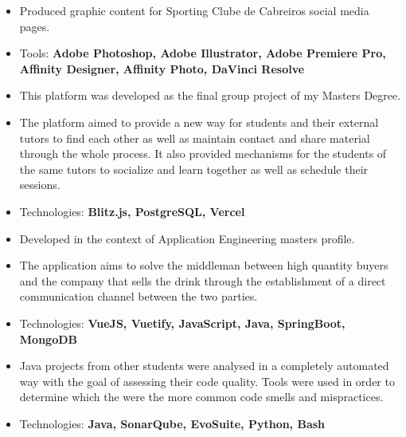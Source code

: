 \documentclass[10pt,a4paper,ragged2e,withhyper]{assets/altacv}
\begin{document}
\begin{paracol}{2}
\begin{itemize}
    \item Produced graphic content for Sporting Clube de Cabreiros social media pages.
    \item Tools: \textbf{Adobe Photoshop, Adobe Illustrator, Adobe Premiere Pro, Affinity Designer, Affinity Photo, DaVinci Resolve}
\end{itemize}

\switchcolumn


\begin{itemize}
    \item This platform was developed as the final group project of my Masters Degree.
    \item The platform aimed to provide a new way for students and their external tutors to find each other as well as maintain contact and share material through the whole process. It also provided mechanisms for the students of the same tutors to socialize and learn together as well as schedule their sessions.
    \item Technologies: \textbf{Blitz.js, PostgreSQL, Vercel}
\end{itemize}

\begin{itemize}
    \item Developed in the context of Application Engineering masters profile.
    \item The application aims to solve the middleman between high quantity buyers and the company that sells the drink through the establishment of a direct communication channel between the two parties.
    \item Technologies: \textbf{VueJS, Vuetify, JavaScript, Java, SpringBoot, MongoDB} 
\end{itemize}

\divider

\begin{itemize}
    \item Java projects from other students were analysed in a completely automated way with the goal of assessing their code quality. Tools were used in order to determine which the were the more common code smells and mispractices.
    \item Technologies: \textbf{Java, SonarQube, EvoSuite, Python, Bash}
\end{itemize}


\end{paracol}
\end{document}
